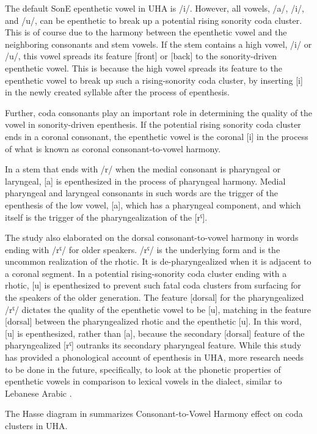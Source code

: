 \documentclass[output=paper,colorlinks,citecolor=brown]{langscibook}
\begin{document}
The default SonE epenthetic vowel in UHA is /i/. However, all vowels, /a/, /i/, and /u/, can be epenthetic to break up a potential rising sonority coda cluster. This is of course due to the harmony between the epenthetic vowel and the neighboring consonants and stem vowels. If the stem contains a high vowel, /i/ or /u/, this vowel spreads its feature [front] or [back] to the sonority-driven epenthetic vowel. This is because the high vowel   spreads its feature to the epenthetic vowel to break up such a rising-sonority coda cluster, by inserting [i] in the newly created syllable after the process of epenthesis.  

Further, coda consonants play an important role in determining the quality of the vowel in sonority-driven epenthesis. If the potential rising sonority coda cluster ends in a coronal consonant, the epenthetic vowel is the coronal [i] in the process of what is known as coronal consonant-to-vowel harmony.

In a stem that ends with /r/ when the medial consonant is pharyngeal or laryngeal, [a] is epenthesized in the process of pharyngeal harmony. Medial pharyngeal and laryngeal consonants in such words are the trigger of the epenthesis of the low vowel, [a], which has a pharyngeal component, and which itself is the trigger of the pharyngealization of the [rˤ]. 

The study also elaborated on the dorsal consonant-to-vowel harmony in words ending with /rˤ/ for older speakers. /rˤ/ is  the underlying form and is the uncommon realization of the rhotic. It is de-pharyngealized when it is adjacent to a coronal segment. In a potential rising-sonority coda cluster ending with a rhotic, [u] is epenthesized to prevent such fatal coda clusters from surfacing for the speakers of the older generation. The feature [dorsal] for the pharyngealized /rˤ/ dictates the quality of the epenthetic vowel to be [u], matching in the feature [dorsal] between the pharyngealized rhotic and the epenthetic [u]. In this word, [u] is epenthesized, rather than [a], because the secondary [dorsal] feature of the pharyngealized [rˤ] outranks its secondary pharyngeal feature. While this study has provided a phonological account of epenthesis in UHA, more research needs to be done in the future, specifically, to look at the phonetic properties of epenthetic vowels in comparison to lexical vowels in the dialect, similar to Lebanese Arabic .

The Hasse diagram in  summarizes Consonant-to-Vowel Harmony effect on coda clusters in UHA.
\end{document}
